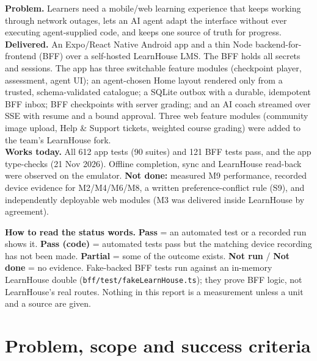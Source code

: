\documentclass[11pt,a4paper]{article}
\newcommand{\pass}{\textcolor{okgreen}{\textbf{Pass}}}
\newcommand{\passcode}{\textcolor{okgreen}{\textbf{Pass (code)}}}
\newcommand{\partl}{\textcolor{partial}{\textbf{Partial}}}
\newcommand{\notrun}{\textcolor{notdone}{\textbf{Not run}}}
\newcommand{\notdone}{\textcolor{notdone}{\textbf{Not done}}}
\newcommand{\fp}[1]{\nolinkurl{#1}}
\begin{document}
\begin{titlepage}
\vspace{0.9cm}
\begin{tcolorbox}[notebox,width=0.92\textwidth,title={\bfseries Executive summary},colbacktitle=accent,coltitle=white]
\small
\textbf{Problem.} Learners need a mobile/web learning experience that keeps working through network
outages, lets an AI agent adapt the interface without ever executing agent-supplied code, and keeps
one source of truth for progress.\\[2pt]
\textbf{Delivered.} An Expo/React Native Android app and a thin Node backend-for-frontend (BFF) over a
self-hosted LearnHouse LMS. The BFF holds all secrets and sessions. The app has three switchable
feature modules (checkpoint player, assessment, agent UI); an agent-chosen Home layout rendered only
from a trusted, schema-validated catalogue; a SQLite outbox with a durable, idempotent BFF inbox; BFF
checkpoints with server grading; and an AI coach streamed over SSE with resume and a bound approval.
Three web feature modules (community image upload, Help \& Support tickets, weighted course grading)
were added to the team's LearnHouse fork.\\[2pt]
\textbf{Works today.} All 612 app tests (90 suites) and 121 BFF tests pass, and the app type-checks (21 Nov 2026).
Offline completion, sync and LearnHouse read-back were observed on the emulator. \textbf{Not done:}
measured M9 performance, recorded device evidence for M2/M4/M6/M8, a written preference-conflict rule
(S9), and independently deployable web modules (M3 was delivered inside LearnHouse by agreement).
\end{tcolorbox}
\end{titlepage}

\tableofcontents
\vspace{0.4cm}
\begin{tcolorbox}[notebox]
\small\textbf{How to read the status words.} \pass{} = an automated test or a recorded run shows it.
\passcode{} = automated tests pass but the matching device recording has not been made.
\partl{} = some of the outcome exists. \notrun{} / \notdone{} = no evidence. Fake-backed BFF tests run
against an in-memory LearnHouse double (\fp{bff/test/fakeLearnHouse.ts}); they prove BFF logic, not
LearnHouse's real routes. Nothing in this report is a measurement unless a unit and a source are given.
\end{tcolorbox}
\newpage

\section{Problem, scope and success criteria}
\end{document}
